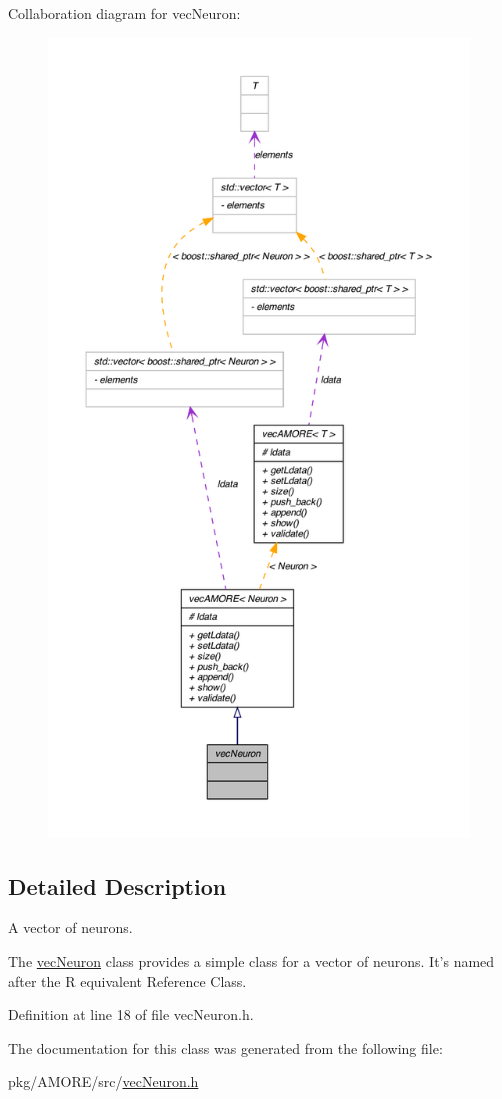 Collaboration diagram for vecNeuron:\nopagebreak
\begin{figure}[H]
\begin{center}
\leavevmode
\includegraphics[height=600pt]{classvec_neuron__coll__graph}
\end{center}
\end{figure}


\subsection{Detailed Description}
A vector of neurons. 

The \hyperlink{classvec_neuron}{vecNeuron} class provides a simple class for a vector of neurons. It's named after the R equivalent Reference Class. 

Definition at line 18 of file vecNeuron.h.



The documentation for this class was generated from the following file:\begin{DoxyCompactItemize}
\item 
pkg/AMORE/src/\hyperlink{vec_neuron_8h}{vecNeuron.h}\end{DoxyCompactItemize}
